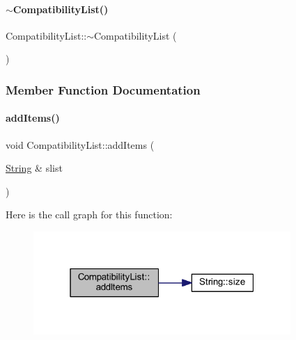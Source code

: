 \paragraph{\texorpdfstring{$\sim$CompatibilityList()}{~CompatibilityList()}}
{\footnotesize\ttfamily Compatibility\+List\+::$\sim$\+Compatibility\+List (\begin{DoxyParamCaption}{ }\end{DoxyParamCaption})\hspace{0.3cm}{\ttfamily [inline]}}



\subsubsection{Member Function Documentation}
\mbox{\label{class_compatibility_list_a7d9dbeada758ed1fc4849d77058ff69d}} 
\paragraph{\texorpdfstring{addItems()}{addItems()}}
{\footnotesize\ttfamily void Compatibility\+List\+::add\+Items (\begin{DoxyParamCaption}\item[{\mbox{\hyperlink{class_string}{String}} \&}]{slist }\end{DoxyParamCaption})}

Here is the call graph for this function\+:
\nopagebreak
\begin{figure}[H]
\begin{center}
\leavevmode
\includegraphics[width=277pt]{class_compatibility_list_a7d9dbeada758ed1fc4849d77058ff69d_cgraph}
\end{center}
\end{figure}
\mbox{\label{class_compatibility_list_a44d0f7533b66ced7a957f2846e76c4ec}} 
